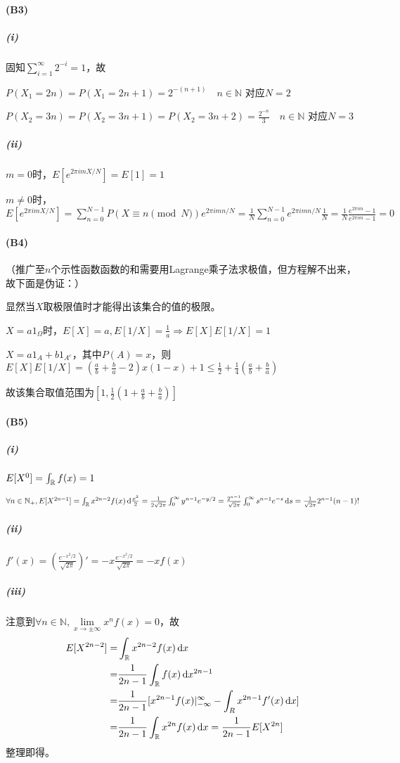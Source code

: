 \documentclass{ctexart}
\begin{document}
\paragraph{(B3)}

\subparagraph{(i)}
固知$\sum_{i=1}^{\infty}2^{-i}=1$，故

$P(X_{1}=2n)=P(X_{1}=2n+1)=2^{-(n+1)}\quad n\in\mathbb{N}$ 对应$N=2$

$P(X_{2}=3n)=P(X_{2}=3n+1)=P(X_{2}=3n+2)=\frac{2^{-n}}{3}\quad n\in\mathbb{N}$ 对应$N=3$

\subparagraph{(ii)}
$m=0$时，$E[e^{2\pi i mX/N}]=E[1]=1$

$m\neq 0$时，$E[e^{2\pi imX/N}]=\sum_{n=0}^{N-1}P(X\equiv n\pmod{N})e^{2\pi i mn/N}=\frac{1}{N}\sum_{n=0}^{N-1}e^{2\pi i mn/N}\frac{1}{N}=\frac{1}{N}\frac{e^{2\pi i m}-1}{e^{2\pi im }-1}=0$

\paragraph{(B4)}
（推广至$n$个示性函数函数的和需要用Lagrange乘子法求极值，但方程解不出来，故下面是伪证：）

显然当$X$取极限值时才能得出该集合的值的极限。

$X=a1_{\Omega}$时，$E[X]=a,E[1/X]=\frac{1}{a}\Rightarrow E[X]E[1/X]=1$

$X=a1_{A}+b1_{A^{c}}$，其中$P(A)=x$，则$E[X]E[1/X]=(\frac{a}{b}+\frac{b}{a}-2)x(1-x)+1\leq \frac{1}{2}+\frac{1}{4}(\frac{a}{b}+\frac{b}{a})$

故该集合取值范围为$[1,\frac{1}{2}(1+\frac{a}{b}+\frac{b}{a})]$

\paragraph{(B5)}
\subparagraph{(i)}
$E[X^{0}]=\int_{\mathbb{R}}f(x)=1$

$\forall n\in\mathbb{N}_{+},E[X^{2n-1}]=\int_{\mathbb{R}}x^{2n-2}f(x)\,\mathrm{d}\frac{x^{2}}{2}=\frac{1}{2\sqrt{2\pi}}\int_{0}^{\infty}y^{n-1}e^{-y/2}=\frac{2^{n-1}}{\sqrt{2\pi}}\int_{0}^{\infty}s^{n-1}e^{-s}\,\mathrm{d} s=\frac{1}{\sqrt{2\pi}}2^{n-1}(n-1)!$

\subparagraph{(ii)}
$f'(x)=(\frac{e^{-x^{2}/2}}{\sqrt{2\pi}})'=-x\frac{e^{-x^{2}/2}}{\sqrt{2\pi}}=-xf(x)$

\subparagraph{(iii)}
注意到$\forall n\in\mathbb{N}, \lim\limits_{x\to\pm\infty}x^{n}f(x)=0$，故
\begin{align*}
  E[X^{2n-2}]=&\int_{\mathbb{R}}x^{2n-2}f(x)\,\mathrm{d} x\\
  =&\frac{1}{2n-1}\int_{\mathbb{R}}f(x)\,\mathrm{d} x^{2n-1}\\
  =&\frac{1}{2n-1}[x^{2n-1}f(x)|_{-\infty}^{\infty}-\int_{R}x^{2n-1}f'(x)\,\mathrm{d} x]\\
  =&\frac{1}{2n-1}\int_{\mathbb{R}}x^{2n}f(x)\,\mathrm{d} x=\frac{1}{2n-1}E[X^{2n}]
\end{align*}
整理即得。
\end{document}
